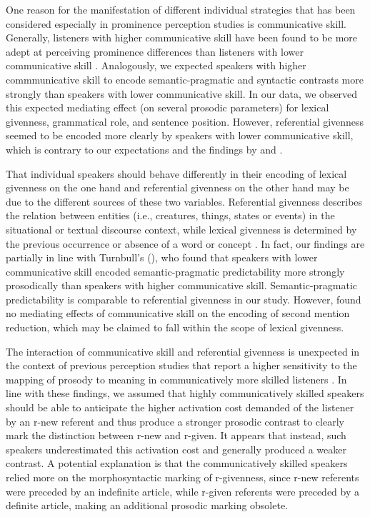 One reason for the manifestation of different individual strategies that has been considered especially in prominence perception studies is communicative skill. Generally, listeners with higher communicative skill have been found to be more adept at perceiving prominence differences than listeners with lower communicative skill \citep{bishopPhonologyPhoneticsSignalextrinsic2020, orricoInfluenceEmpathyAutisticlike2023}. Analogously, we expected speakers with higher commmunicative skill to encode semantic-pragmatic and syntactic contrasts more strongly than speakers with lower communicative skill. In our data, we observed this expected mediating effect (on several prosodic parameters) for lexical givenness, grammatical role, and sentence position. However, referential givenness seemed to be encoded more clearly by speakers with lower communicative skill, which is contrary to our expectations and the findings by \citet{bishopPhonologyPhoneticsSignalextrinsic2020} and \citet{orricoInfluenceEmpathyAutisticlike2023}. 

That individual speakers should behave differently in their encoding of lexical givenness on the one hand and referential givenness on the other hand may be due to the different sources of these two variables. Referential givenness describes the relation between entities (i.e., creatures, things, states or events) in the situational or textual discourse context, while lexical givenness is determined by the previous occurrence or absence of a word or concept \citep{baumannCoreferenceLexicalGivenness2013}. In fact, our findings are partially in line with Turnbull's (\citeyear{turnbullListenerorientedPhoneticReduction2019}), who found that speakers with lower communicative skill encoded semantic-pragmatic predictability more strongly prosodically than speakers with higher communicative skill. Semantic-pragmatic predictability is comparable to referential givenness in our study. However, \citet{turnbullListenerorientedPhoneticReduction2019} found no mediating effects of communicative skill on the encoding of second mention reduction, which may be claimed to fall within the scope of lexical givenness.
 
The interaction of communicative skill and referential givenness is unexpected in the context of previous perception studies that report a higher sensitivity to the mapping of prosody to meaning in communicatively more skilled listeners \citep{bishopPhonologyPhoneticsSignalextrinsic2020, orricoInfluenceEmpathyAutisticlike2023}. In line with these findings, we assumed that highly communicatively skilled speakers should be able to anticipate the higher activation cost demanded of the listener by an r-new referent \citep{chafeDiscourseConsciousnessTime1994} and thus produce a stronger prosodic contrast to clearly mark the distinction between r-new and r-given. It appears that instead, such speakers underestimated this activation cost and generally produced a weaker contrast. A potential explanation is that the communicatively skilled speakers relied more on the morphosyntactic marking of r-givenness, since r-new referents were preceded by an indefinite article, while r-given referents were preceded by a definite article, making an additional prosodic marking obsolete. 

